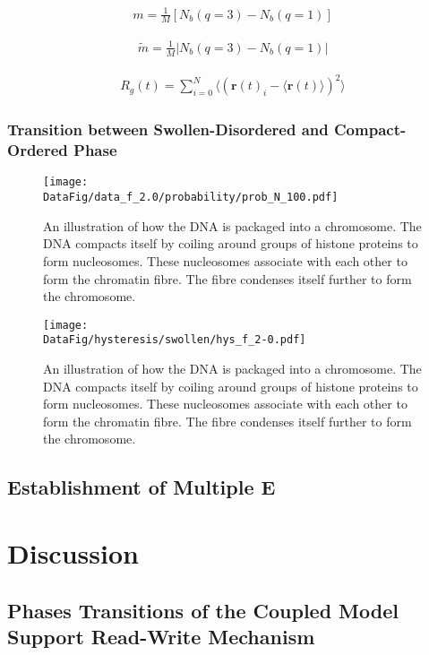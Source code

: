 \documentclass[12pt]{article}
\newcommand*{\DataFig}{/Users/MichaelChiang/Desktop/epigenetics_data/}
\newcommand{\abs}[1]{\left|#1\right|}
\begin{document}
\begin{eqnarray}
m = \frac{1}{M}\left[N_b(q = 3) - N_b(q = 1)\right]
\end{eqnarray}

\begin{eqnarray}
\widetilde{m} = \frac{1}{M}\abs{N_b(q = 3) - N_b(q = 1)}
\end{eqnarray}


\begin{eqnarray}
R_g(t) = \sum_{i = 0}^{N} \langle\left(\bm{r}(t)_{i} - \langle \bm{r}(t) \rangle\right)^2\rangle
\end{eqnarray}

\subsubsection{Transition between Swollen-Disordered and Compact-Ordered Phase}

\begin{figure}[h]
\centering
\texttt{[image: \\DataFig/data\_f\_2.0/probability/prob\_N\_100.pdf]}
\caption{An illustration of how the DNA is packaged into a chromosome. The DNA compacts itself by coiling around groups of histone proteins to form nucleosomes. These nucleosomes associate with each other to form the chromatin fibre. The fibre condenses itself further to form the chromosome.}
\label{fig:chromosome}
\end{figure}

\begin{figure}[h]
\centering
\texttt{[image: \\DataFig/hysteresis/swollen/hys\_f\_2-0.pdf]}
\caption{An illustration of how the DNA is packaged into a chromosome. The DNA compacts itself by coiling around groups of histone proteins to form nucleosomes. These nucleosomes associate with each other to form the chromatin fibre. The fibre condenses itself further to form the chromosome.}
\label{fig:chromosome}
\end{figure}
\FloatBarrier

\subsection{Establishment of Multiple E}





\section{Discussion}
\subsection{Phases Transitions of the Coupled Model Support Read-Write Mechanism}
\end{document}
